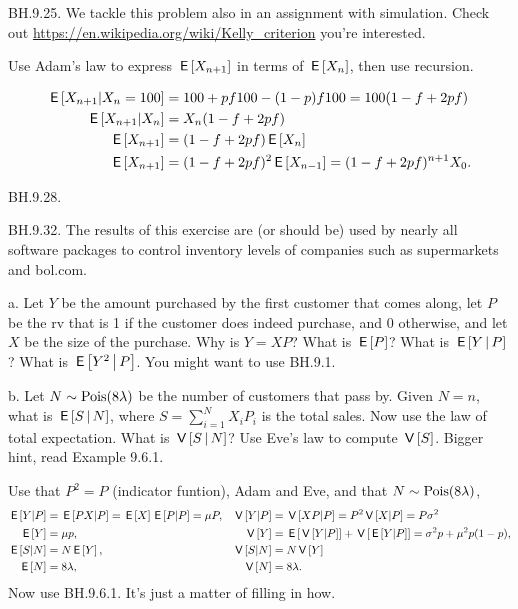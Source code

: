 \begin{exercise}
BH.9.25. We tackle this problem also in an assignment with simulation.  Check out \url{https://en.wikipedia.org/wiki/Kelly_criterion} you're interested.
\begin{hint}
Use Adam's law to express $\,\mathsf{E}\left[X_{n+1}\right]$ in terms of $\,\mathsf{E}\left[X_{n}\right]$, then use recursion.
\end{hint}
\begin{solution}
\begin{align*}
  \,\mathsf{E}\left[X_{n+1} |X_n=100\right] &= 100 + pf 100 - (1-p)f 100  = 100(1-f + 2pf) \\
  \,\mathsf{E}\left[X_{n+1} |X_n\right] &= X_{n}( 1- f + 2pf) \\
  \,\mathsf{E}\left[X_{n+1} \right] &= ( 1- f + 2pf) \,\mathsf{E}\left[X_{n}\right] \\
  \,\mathsf{E}\left[X_{n+1} \right] &= ( 1- f + 2pf)^{2} \,\mathsf{E}\left[X_{n-1}\right] =  ( 1- f + 2pf)^{n+1}X_{0}.
\end{align*}
\end{solution}
\end{exercise}


\begin{exercise}
BH.9.28.
\end{exercise}


\begin{exercise}
BH.9.32. The results of this exercise are (or should be) used by nearly all software packages to control inventory levels of companies such as supermarkets and bol.com.
\begin{hint}
a. Let $Y$ be the amount purchased by the first customer that comes along, let $P$ be the rv that is 1 if the customer does indeed purchase, and 0 otherwise, and let $X$ be the size of the purchase. Why is $Y=XP$? What is $\,\mathsf{E}\left[P\right]$? What is $\,\mathsf{E}\left[Y\,\middle|\, P\right]$? What is $\,\mathsf{E}\left[Y^{2}\,\middle|\, P\right]$. You might want to use BH.9.1.


b. Let $N\sim\mathrm{Pois}(8\lambda)$ be the number of customers that pass by. Given $N=n$, what is $\,\mathsf{E}\left[S\,\middle|\, N\right]$, where $S=\sum_{i=1}^N X_iP_{i}$ is the total sales. Now use the law of total expectation. What is $\,\mathsf{V}\left[S\,\middle|\, N\right]$? Use Eve's law  to compute $\,\mathsf{V}\left[S\right]$. Bigger hint, read Example 9.6.1.
\end{hint}
\begin{solution}
Use that $P^{2}=P$ (indicator funtion), Adam and Eve, and that $N\sim \mathrm{Pois}(8\lambda)$,
\begin{align*}
  \,\mathsf{E}\left[Y|P\right]&= \,\mathsf{E}\left[PX|P\right] = \,\mathsf{E}\left[X\right]\,\mathsf{E}\left[P|P\right] = \mu P, &\,\mathsf{V}\left[Y|P\right] &= \,\mathsf{V}\left[XP|P\right] = P^{2} \,\mathsf{V}\left[X|P\right] = P \sigma^2 \\
  \,\mathsf{E}\left[Y\right] &= \mu p, & \,\mathsf{V}\left[Y\right] &= \,\mathsf{E}\left[\,\mathsf{V}\left[Y|P\right]\right] + \,\mathsf{V}\left[\,\mathsf{E}\left[Y|P\right]\right] = \sigma^2 p + \mu^{2}p(1-p), \\
  \,\mathsf{E}\left[S|N\right] &= N \,\mathsf{E}\left[Y\right], & \,\mathsf{V}\left[S|N\right] &= N \,\mathsf{V}\left[Y\right] \\
  \,\mathsf{E}\left[N\right] &= 8 \lambda, & \,\mathsf{V}\left[N\right] &=  8\lambda.
\end{align*}
Now use BH.9.6.1. It's just a matter of filling in how.
\end{solution}
\end{exercise}

